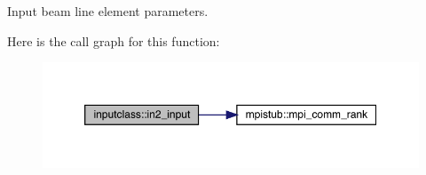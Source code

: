 Input beam line element parameters. 

Here is the call graph for this function\+:\nopagebreak
\begin{figure}[H]
\begin{center}
\leavevmode
\includegraphics[width=350pt]{namespaceinputclass_a943f99f8cd6dc0476378072a9d4d27cd_cgraph}
\end{center}
\end{figure}
\mbox{\label{namespaceinputclass_af6c761d115ea894925da33378b4bdf7d}} 
